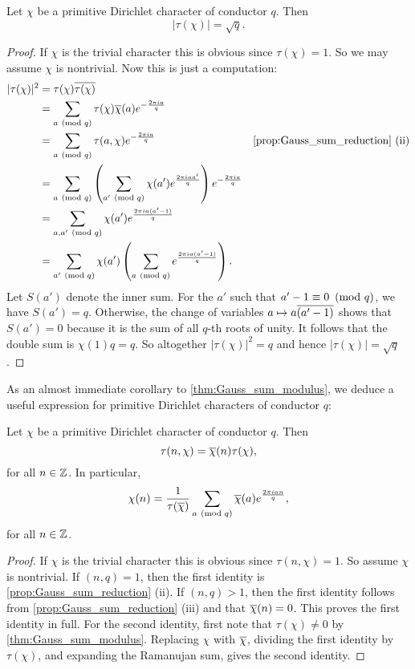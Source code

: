       \begin{theorem}\label{thm:Gauss_sum_modulus}
        Let $\chi$ be a primitive Dirichlet character of conductor $q$. Then
        \[
          |\tau(\chi)| = \sqrt{q}.
        \]
      \end{theorem}
      \begin{proof}
        If $\chi$ is the trivial character this is obvious since $\tau(\chi) = 1$. So we may assume $\chi$ is nontrivial. Now this is just a computation:
        \begin{align*}
          |\tau(\chi)|^{2} &= \tau(\chi)\conj{\tau(\chi)} \\
          &= \sum_{a \tmod{q}}\tau(\chi)\cchi(a)e^{-\frac{2\pi ia}{q}} \\
          &=  \sum_{a \tmod{q}}\tau(a,\chi)e^{-\frac{2\pi ia}{q}} & \text{\cref{prop:Gauss_sum_reduction} (ii)} \\
          &= \sum_{a \tmod{q}}\left(\sum_{a' \tmod{q}}\chi(a')e^{\frac{2\pi iaa'}{q}}\right)e^{-\frac{2\pi ia}{q}} \\
          &= \sum_{a,a' \tmod{q}}\chi(a')e^{\frac{2\pi ia(a'-1)}{q}} \\
          &= \sum_{a' \tmod{q}}\chi(a')\left(\sum_{a \tmod{q}}e^{\frac{2\pi ia(a'-1)}{q}}\right).
        \end{align*}
        Let $S(a')$ denote the inner sum. For the $a'$ such that $a'-1 \equiv 0 \ \left(\text{mod }q\right)$, we have $S(a') = q$. Otherwise, the change of variables $a \mapsto a\overline{(a'-1)}$ shows that $S(a') = 0$ because it is the sum of all $q$-th roots of unity. It follows that the double sum is $\chi(1)q = q$. So altogether $|\tau(\chi)|^{2} = q$ and hence $|\tau(\chi)| = \sqrt{q}$.
      \end{proof}

      As an almost immediate corollary to \cref{thm:Gauss_sum_modulus}, we deduce a useful expression for primitive Dirichlet characters of conductor $q$:

      \begin{corollary}\label{cor:gauss_sum_primitive_formula}
        Let $\chi$ be a primitive Dirichlet character of conductor $q$. Then
        \[
          \tau(n,\chi) = \overline{\chi}(n)\tau(\chi),
        \]
        for all $n \in \mathbb{Z}$. In particular,
        \[
          \chi(n) = \frac{1}{\tau(\overline{\chi})}\sum_{a \ \left(\text{mod }q\right)}\overline{\chi}(a)e^{\frac{2\pi ian}{q}},
        \]
        for all $n \in \mathbb{Z}$.
      \end{corollary}
      \begin{proof}
        If $\chi$ is the trivial character this is obvious since $\tau(n,\chi) = 1$. So assume $\chi$ is nontrivial. If $(n,q) = 1$, then the first identity is \cref{prop:Gauss_sum_reduction} (ii). If $(n,q) > 1$, then the first identity follows from \cref{prop:Gauss_sum_reduction} (iii) and that $\overline{\chi}(n) = 0$. This proves the first identity in full. For the second identity, first note that $\tau(\chi) \neq 0$ by \cref{thm:Gauss_sum_modulus}. Replacing $\chi$ with $\overline{\chi}$, dividing the first identity by $\tau(\chi)$, and expanding the Ramanujan sum, gives the second identity.
      \end{proof}

